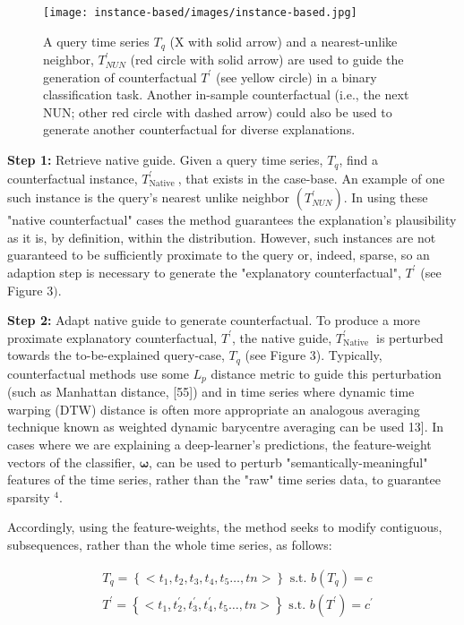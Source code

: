 \begin{figure}[h]
    \centering
    \texttt{[image: instance-based/images/instance-based.jpg]}
    \caption{A query time series $T_{q}$ (X with solid arrow) and a nearest-unlike neighbor, $T_{N U N}^{\prime}$ (red circle with solid arrow) are used to guide the generation of counterfactual $T^{\prime}$ (see yellow circle) in a binary classification task. Another in-sample counterfactual (i.e., the next NUN; other red circle with dashed arrow) could also be used to generate another counterfactual for diverse explanations.}
\end{figure}


\textbf{Step 1:} Retrieve native guide. Given a query time series, $T_{q}$, find a counterfactual instance, $T_{\text {Native }}^{\prime}$, that exists in the case-base. An example of one such instance is the query's nearest unlike neighbor $\left(T_{N U N}^{\prime}\right)$. In using these "native counterfactual" cases the method guarantees the explanation's plausibility as it is, by definition, within the distribution. However, such instances are not guaranteed to be sufficiently proximate to the query or, indeed, sparse, so an adaption step is necessary to generate the "explanatory counterfactual", $T^{\prime}$ (see Figure $3)$.

\textbf{Step 2:} Adapt native guide to generate counterfactual. To produce a more proximate explanatory counterfactual, $T^{\prime}$, the native guide, $T_{\text {Native }}^{\prime}$ is perturbed towards the to-be-explained query-case, $T_{q}$ (see Figure 3). Typically, counterfactual methods use some $L_{p}$ distance metric to guide this perturbation (such as Manhattan distance, [55]) and in time series where dynamic time warping (DTW) distance is often more appropriate an analogous averaging technique known as weighted dynamic barycentre averaging can be used 13]. In cases where we are explaining a deep-learner's predictions, the feature-weight vectors of the classifier, $\boldsymbol{\omega}$, can be used to perturb "semantically-meaningful" features of the time series, rather than the "raw" time series data, to guarantee sparsity ${ }^{4}$.

Accordingly, using the feature-weights, the method seeks to modify contiguous, subsequences, rather than the whole time series, as follows:

$$
\begin{aligned}
& T_{q}=\left\{<t_{1}, t_{2}, t_{3}, t_{4}, t_{5} \ldots, t n>\right\} \text { s.t. } b\left(T_{q}\right)=c \\
& T^{\prime}=\left\{<t_{1}, t_{2}^{\prime}, t_{3}^{\prime}, t_{4}^{\prime}, t_{5} \ldots, t n>\right\} \text { s.t. } b\left(T^{\prime}\right)=c^{\prime}
\end{aligned}
$$

